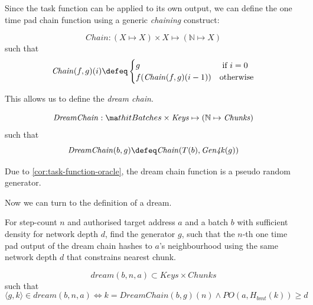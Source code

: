 Since the task function can be applied to its own output, we can define the one time pad chain function using a generic \emph{chaining} construct:

\begin{definition}[Chaining]
\label{def:chaining}
\begin{equation}
\mathit{Chain}: (X \mapsto X) \times X \mapsto (\mathbb{N} \mapsto X)
\end{equation}
such that
\begin{equation}
\mathit{Chain}(f,g)(i)\defeq\begin{cases}g&\text{ if }  i=0\\
f(\mathit{Chain}(f,g)(i-1)) & \text{otherwise}
\end{cases}
\end{equation}
\end{definition}

This allows us to define the \emph{dream chain}.

\begin{definition}
\begin{equation}
\mathit{DreamChain}: \ma  thit{Batches}\times \mathit{Keys} \mapsto (\mathbb{N} \mapsto \mathit{Chunks})
\end{equation}
such that
\begin{equation}
\mathit{DreamChain}(b,g) \defeq \mathit{Chain}(T(b),\mathit{Gen4k}(g))
\end{equation}
\end{definition}


\begin{corollary}
\label{cor:dream-chain-oracle}
Due to \ref{cor:task-function-oracle}, the dream chain function is a pseudo random generator.
\end{corollary}
Now we can turn to the definition of a dream.

\begin{definition}
\label{def:dream-otp}
For step-count $n$ and authorised target address $a$ and a batch $b$ with sufficient density for network depth $d$, find the generator $g$, such that
the $n$-th one time pad output of the dream chain hashes to $a$'s neighbourhood using the same network depth $d$ that constrains nearest chunk.

\begin{equation}
\mathit{dream}(b,n,a) \subset \mathit{Keys}\times\mathit{Chunks}
\end{equation}
such that
\begin{equation}
\langle g, k\rangle \in \mathit{dream}(b,n,a) \Longleftrightarrow
k=\mathit{DreamChain}(b,g)(n)
\land
\mathit{PO}(a,H_{\mathit{bmt}}(k))\geq d
\end{equation}

\end{definition}

